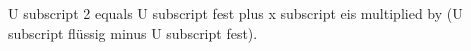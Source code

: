 U subscript 2 equals U subscript fest plus x subscript eis multiplied by (U subscript flüssig minus U subscript fest).